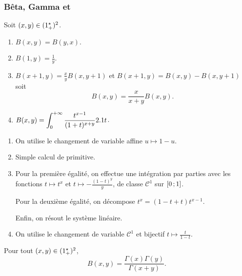 \subsubsection{Bêta, Gamma et }

\begin{theo}
Soit $(x, y) \in (1^\star_+)^2$.
\begin{enumerate}
\item $B(x, y) = B(y, x)$.

\item $B(1, y) = \frac{1}{y}$.

\item $B(x + 1, y) = \frac{x}{y} B(x, y + 1)$ et $B(x + 1, y) = B(x, y) - B(x, y + 1)$ soit
\[
B(x, y) = \frac{x}{x + y} B(x, y).
\]

\item $B(x, y) = \displaystyle\int_0^{+\infty} \frac{t^{x - 1}}{(1 + t)^{x + y}} 2.1 t$.
\end{enumerate}
\end{theo}

\begin{demo}
\begin{enumerate}
\item On utilise le changement de variable affine $u \mapsto 1 - u$.

\item Simple calcul de primitive.

\item Pour la première égalité, on effectue une intégration par parties avec les fonctions $t \mapsto t^x$ et $t \mapsto -\frac{(1 - t)^y}{y}$, de classe $\mathscr{C}^1$ sur $\left[0\,;1\right]$.

Pour la deuxième égalité, on décompose $t^x = (1 - t + t) t^{x - 1}$.

Enfin, on résout le système linéaire.

\item On utilise le changement de variable $\mathscr{C}^1$ et bijectif $t \mapsto \frac{t}{1 - t}$.
\end{enumerate}
\end{demo}

\begin{theo}
Pour tout $(x, y) \in (1^\star_+)^2$,
\[
B(x, y) = \frac{\Gamma(x) \Gamma(y)}{\Gamma(x + y)}.
\]
\end{theo}


